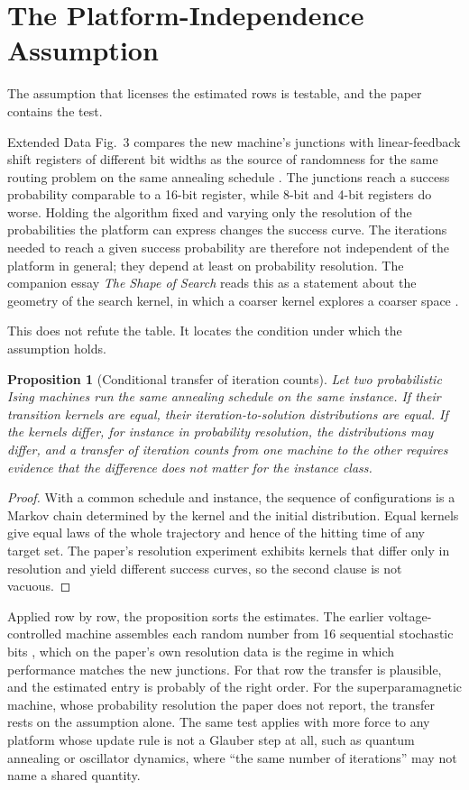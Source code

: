 \documentclass[11pt]{article}
\newtheorem{proposition}{Proposition}
\theoremstyle{definition}
\theoremstyle{remark}
\begin{document}
\section{The Platform-Independence Assumption}

The assumption that licenses the estimated rows is testable, and the paper contains the test.

Extended Data Fig.~3 compares the new machine's junctions with linear-feedback shift registers of different bit widths as the source of randomness for the same routing problem on the same annealing schedule \cite{li2026}. The junctions reach a success probability comparable to a 16-bit register, while 8-bit and 4-bit registers do worse. Holding the algorithm fixed and varying only the resolution of the probabilities the platform can express changes the success curve. The iterations needed to reach a given success probability are therefore not independent of the platform in general; they depend at least on probability resolution. The companion essay \emph{The Shape of Search} reads this as a statement about the geometry of the search kernel, in which a coarser kernel explores a coarser space \cite{flyxion-shape}.

This does not refute the table. It locates the condition under which the assumption holds.

\begin{proposition}[Conditional transfer of iteration counts]
Let two probabilistic Ising machines run the same annealing schedule on the same instance. If their transition kernels are equal, their iteration-to-solution distributions are equal. If the kernels differ, for instance in probability resolution, the distributions may differ, and a transfer of iteration counts from one machine to the other requires evidence that the difference does not matter for the instance class.
\end{proposition}

\begin{proof}
With a common schedule and instance, the sequence of configurations is a Markov chain determined by the kernel and the initial distribution. Equal kernels give equal laws of the whole trajectory and hence of the hitting time of any target set. The paper's resolution experiment exhibits kernels that differ only in resolution and yield different success curves, so the second clause is not vacuous.
\end{proof}

Applied row by row, the proposition sorts the estimates. The earlier voltage-controlled machine assembles each random number from 16 sequential stochastic bits \cite{li2026,duffee2025}, which on the paper's own resolution data is the regime in which performance matches the new junctions. For that row the transfer is plausible, and the estimated entry is probably of the right order. For the superparamagnetic machine, whose probability resolution the paper does not report, the transfer rests on the assumption alone. The same test applies with more force to any platform whose update rule is not a Glauber step at all, such as quantum annealing or oscillator dynamics, where ``the same number of iterations'' may not name a shared quantity.
\end{document}
